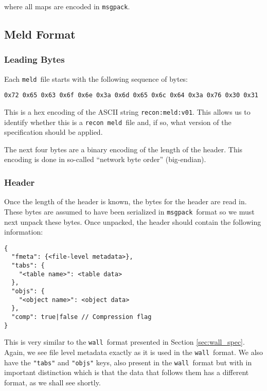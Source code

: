 \documentclass[11pt,a4paper,onecolumn]{article}
\newcommand{\recon}{\texttt{recon}}
\newcommand{\wall}{\texttt{wall}}
\newcommand{\meld}{\texttt{meld}}
\newcommand{\msgpack}{\texttt{msgpack}}
\newcommand{\code}[1]{\texttt{#1}} %
\begin{document}
where all maps are encoded in \msgpack.

\subsection{Meld Format}
\label{sec:meld_spec}

\subsubsection{Leading Bytes}

Each \meld\ file starts with the following sequence of bytes:

\begin{verbatim}
0x72 0x65 0x63 0x6f 0x6e 0x3a 0x6d 0x65 0x6c 0x64 0x3a 0x76 0x30 0x31
\end{verbatim}

This is a hex encoding of the ASCII string \code{recon:meld:v01}.
This allows us to identify whether this is a \recon\ \meld\ file and, if
so, what version of the specification should be applied.

The next four bytes are a binary encoding of the length of the header.
This encoding is done in so-called ``network byte order''
(big-endian).

\subsubsection{Header}
\label{sec:meld_head}

Once the length of the header is known, the bytes for the header are
read in.  These bytes are assumed to have been serialized in
\msgpack\ format so we must next unpack these bytes.  Once unpacked,
the header should contain the following information:

\begin{verbatim}
{
  "fmeta": {<file-level metadata>},
  "tabs": {
    "<table name>": <table data>
  },
  "objs": {
    "<object name>": <object data>
  },
  "comp": true|false // Compression flag
}
\end{verbatim}

This is very similar to the \wall\ format presented in Section
\ref{sec:wall_spec}.  Again, we see file level metadata exactly as it
is used in the \wall\ format.  We also have the \code{"tabs"} and
\code{"objs"} keys, also present in the \wall\ format but with in
important distinction which is that the data that follows them has a
different format, as we shall see shortly.
\end{document}
